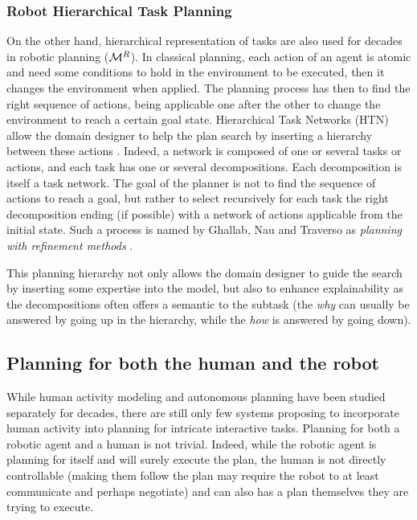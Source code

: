 \documentclass[a4paper,11pt,twoside]{StyleThese}
\begin{document}
\subsubsection{Robot Hierarchical Task Planning}
On the other hand, hierarchical representation of tasks are also used for decades in robotic planning ($\mathcal{M}^R$). In classical planning, each action of an agent is atomic and need some conditions to hold in the environment to be executed, then it changes the environment when applied. The planning process has then to find the right sequence of actions, being applicable one after the other to change the environment to reach a certain goal state. Hierarchical Task Networks (HTN) allow the domain designer to help the plan search by inserting a hierarchy between these actions \cite{erol1996complexity}. Indeed, a network is composed of one or several tasks or actions, and each task has one or several decompositions. Each decomposition is itself a task network. The goal of the planner is not to find the sequence of actions to reach a goal, but rather to select recursively for each task the right decomposition ending (if possible) with a network of actions applicable from the initial state. Such a process is named by Ghallab, Nau and Traverso as \textit{planning with refinement methods} \cite{ghallab_nau_traverso_2016}.

This planning hierarchy not only allows the domain designer to guide the search by inserting some expertise into the model, but also to enhance explainability as the decompositions often offers a semantic to the subtask (the \textit{why} can usually be answered by going up in the hierarchy, while the \textit{how} is answered by going down).

\subsection{Planning for both the human and the robot}
While human activity modeling and autonomous planning have been studied separately for decades, there are still only few systems proposing to incorporate human activity into planning for intricate interactive tasks.
Planning for both a robotic agent and a human is not trivial. Indeed, while the robotic agent is planning for itself and will surely execute the plan, the human is not directly controllable (making them follow the plan may require the robot to at least communicate and perhaps negotiate) and can also has a plan themselves they are trying to execute.
\end{document}
